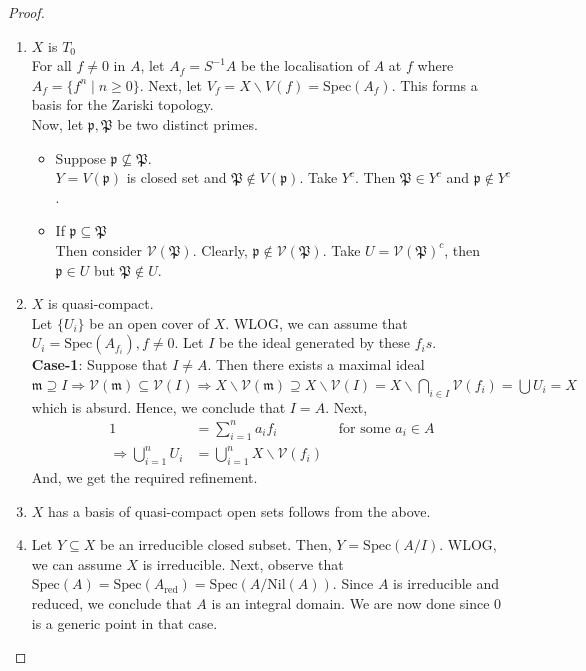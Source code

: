 \documentclass[oneside, 12pt, ]{scrbook}
\newcommand{\V}{\mathcal{V}}
\newcommand{\spec}{\mathrm{Spec}}
\newcommand{\pr}{\mathfrak{p}}
\newcommand{\m}{\mathfrak{m}}
\newcommand{\nil}{\mathrm{Nil}}
\theoremstyle{theorem}
\begin{document}
\begin{proof}
\begin{enumerate}
\item $X$ is $T_{0}$ \\
For all $f \neq 0$ in $A$,  let $A_{f} = S^{-1}A$ be the localisation of $A$ at $f$ where $A_{f} = \{f^n \mid n \geq 0\}$. Next, let $V_{f} = X \backslash V(f) = \spec (A_{f})$. This forms a basis for the Zariski topology. \\
Now, let $\pr, \mathfrak{P}$ be two distinct primes. 
\begin{itemize}
\item Suppose $\pr \not \subseteq \mathfrak{P}$. \\
$Y = V(\pr)$ is closed set and $\mathfrak{P} \not \in V(\pr)$. Take $Y^c$. Then $\mathfrak{P} \in Y^c$ and $\pr \not \in Y^c$. 
\item If $\pr \subseteq \mathfrak{P}$ \\
Then consider $\V(\mathfrak{P})$. Clearly, $\pr \not \in \V(\mathfrak{P})$. Take $U = \V(\mathfrak{P})^c$, then $\pr \in U$ but $\mathfrak{P} \not\in U$. 
\end{itemize}
\item $X$ is quasi-compact. \\
Let $\{U_{i}\}$ be an open cover of $X$. WLOG, we can assume that $U_{i} = \spec(A_{f_{i}}), f \neq 0$. Let $I$ be the ideal generated by these $f_{i}s$. \\
\textbf{Case-1}: Suppose that $I \neq A$. Then there exists a maximal ideal $\m \supseteq I \Rightarrow \V(\m) \subseteq \V(I) \Rightarrow X \backslash \V(\m) \supseteq X\backslash \V(I) = X \backslash \bigcap_{i \in I}\V(f_{i}) = \bigcup U_{i} = X$ which is absurd. Hence, we conclude that $I=A$. Next, 
\begin{align*}
1 &= \sum_{i=1}^n a_{i}f_{i} &\text{ for some } a_{i} \in A \\
\Rightarrow \bigcup_{i=1}^n U_{i} &= \bigcup_{i=1}^n X \backslash \V(f_{i})
\end{align*}
And, we get the required refinement. 
\item $X$ has a basis of quasi-compact open sets follows from the above.
\item Let $Y \subseteq X$ be an irreducible closed subset. Then, $Y = \spec(A/I)$. WLOG, we can assume $X$ is irreducible. Next, observe that $\spec(A) = \spec(A_{\mathrm{red}}) = \spec(A/ \nil(A))$. Since $A$ is irreducible and reduced, we conclude that $A$ is an integral domain. We are now done since $0$ is a generic point in that case.
\end{enumerate}
\end{proof}
\end{document}
